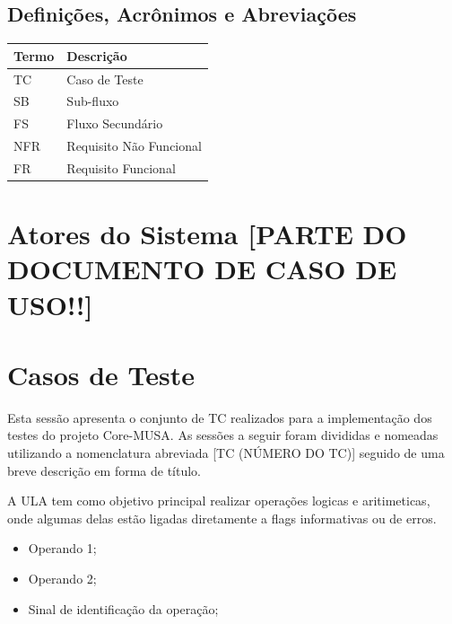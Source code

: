 \documentclass{article}
\begin{document}
  \subsection{Definições, Acrônimos e Abreviações}
  \FloatBarrier
    \begin{table}[H] 
      \begin{center}
        \begin{tabular}[pos]{|m{2cm} | m{8cm}|} 
          \hline 
          \cellcolor[gray]{0.9}\textbf{Termo} & \cellcolor[gray]{0.9}\textbf{Descrição} \\ \hline
          TC & Caso de Teste  \\ \hline
          SB & Sub-fluxo \\ \hline
          FS & Fluxo Secundário \\ \hline
          NFR & Requisito Não Funcional \\ \hline
          FR & Requisito Funcional \\
          \hline
        \end{tabular}
      \end{center}
    \label{tab:definicoes}
    \end{table}

  \section{Atores do Sistema [PARTE DO DOCUMENTO DE CASO DE USO!!]}
  
  \section{Casos de Teste}
  Esta sessão apresenta o conjunto de TC realizados para a implementação dos testes do projeto Core-MUSA. As sessões a seguir foram divididas e nomeadas utilizando a nomenclatura abreviada [TC (NÚMERO DO TC)] seguido de uma breve descrição em forma de título.

A ULA tem como objetivo principal realizar operações logicas e aritimeticas, onde algumas delas estão ligadas diretamente a flags informativas ou de erros.
  
  	\begin{itemize}
     \item Operando 1;
     \item Operando 2;
     \item Sinal de identificação da operação;
     \end{itemize}
    
\end{document}
